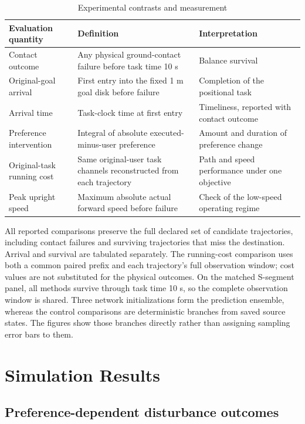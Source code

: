 \documentclass[journal]{IEEEtran}
\begin{document}
\begin{table}[tp]
\caption{Experimental contrasts and measurement}
\centering
\begin{tabular}{p{}p{}p{}}
\hline
Evaluation quantity & Definition & Interpretation \\
\hline
Contact outcome & Any physical ground-contact failure before task time 10 s & Balance survival \\
\hline
Original-goal arrival & First entry into the fixed 1 m goal disk before failure & Completion of the positional task \\
\hline
Arrival time & Task-clock time at first entry & Timeliness, reported with contact outcome \\
\hline
Preference intervention & Integral of absolute executed-minus-user preference & Amount and duration of preference change \\
\hline
Original-task running cost & Same original-user task channels reconstructed from each trajectory & Path and speed performance under one objective \\
\hline
Peak upright speed & Maximum absolute actual forward speed before failure & Check of the low-speed operating regime \\
\hline
\end{tabular}
\end{table}
All reported comparisons preserve the full declared set of candidate trajectories, including contact failures and surviving trajectories that miss the destination. Arrival and survival are tabulated separately. The running-cost comparison uses both a common paired prefix and each trajectory's full observation window; cost values are not substituted for the physical outcomes. On the matched S-segment panel, all methods survive through task time 10 s, so the complete observation window is shared. Three network initializations form the prediction ensemble, whereas the control comparisons are deterministic branches from saved source states. The figures show those branches directly rather than assigning sampling error bars to them.


\section{Simulation Results}

\subsection{Preference-dependent disturbance outcomes}
\end{document}
